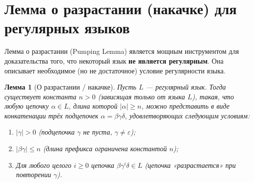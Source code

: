 \documentclass[12pt,a4paper]{article}
\theoremstyle{definition}
\theoremstyle{plain}
\newtheorem{lemma}{Лемма}
\theoremstyle{remark}
\begin{document}
\section{Лемма о разрастании (накачке) для регулярных языков}

Лемма о разрастании (Pumping Lemma) является мощным инструментом для доказательства того, что некоторый язык \textbf{не является регулярным}. Она описывает необходимое (но не достаточное) условие регулярности языка.

\begin{lemma}[О разрастании / накачке]
Пусть $L$ — регулярный язык. Тогда существует константа $n > 0$ (зависящая только от языка $L$), такая, что любую цепочку $\alpha \in L$, длина которой $|\alpha| \ge n$, можно представить в виде конкатенации трёх подцепочек $\alpha = \beta\gamma\delta$, удовлетворяющих следующим условиям:
\begin{enumerate}
    \item $|\gamma| > 0$ (подцепочка $\gamma$ не пуста, $\gamma \neq \varepsilon$);
    \item $|\beta\gamma| \le n$ (длина префикса ограничена константой $n$);
    \item Для любого целого $i \ge 0$ цепочка $\beta\gamma^i\delta \in L$ (цепочка «разрастается» при повторении $\gamma$).
\end{enumerate}
\end{lemma}
\end{document}
